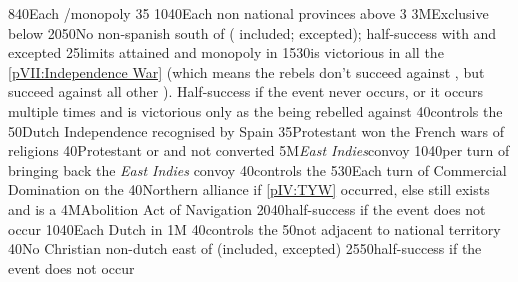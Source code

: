 {8}{40}{Each \CTZ/\STZ monopoly}%
%
%
%
{}{35}{}%
%
%
{10}{40}{Each non national provinces above 3}%
%
\EUobjective3M{Exclusive below }{}%
{20}{50}{No non-spanish \COL south of 
  ( included;  excepted); half-success
  with  and  excepted}%
%
%
{}{25}{\MNU limits attained and monopoly in }%
%
%
{15}{30}{\SPA is victorious in all the \ref{pVII:Independence War} (which
  means the rebels don't succeed against \SPA, but succeed against all other
  \MAJ). Half-success if the event never occurs, or it occurs multiple times
  and \SPA is victorious only as the \MAJ being rebelled against }%
%
 
%
%
{}{40}{\paysmajeurHollande controls the }%
%
%
{}{50}{Dutch Independence recognised by Spain}%
%
%
{}{35}{Protestant won the French wars of religions}%
%
%
{}{40}{\paysmajeurAngleterre Protestant or \PROTANG and not converted}%
%
\EUobjective5M{\emph{East Indies}}{convoy}%
{10}{40}{per turn of bringing back the \emph{East Indies} convoy}%
%
%
%
{}{40}{\paysmajeurHollande controls the }%
%
%
{5}{30}{Each turn of Commercial Domination on the }%
%
%
{}{40}{Northern \HRE alliance if \ref{pIV:TYW} occurred, else \payshanse still
  exists and is a \VASSAL}%
%
\EUobjective4M{Abolition Act of Navigation}{}%
{20}{40}{half-success if the event does not occur}%
%
%
{10}{40}{Each Dutch \COL in \continentBrazil}%
%
%
\EUobjective1M{}{}%
{}{40}{\paysmajeurHollande controls the }%
%
%
{}{50}{\paysmajeurFrance not adjacent to \paysmajeurHollande national
  territory}%
%
%
{}{40}{No Christian non-dutch \TP east of \granderegionMalacca (included,
  \continentSiberia excepted)}%
%
%
{25}{50}{half-success if the event does not occur}%
%
%
